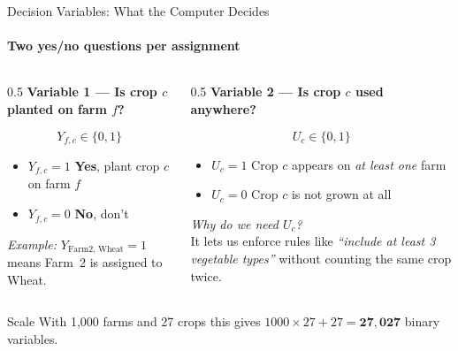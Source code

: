 \begin{frame}{Decision Variables: What the Computer Decides}
    \framesubtitle{Two yes/no questions per assignment}

    \begin{columns}[T]
        \begin{column}{0.5\textwidth}
            \textbf{Variable 1 — Is crop $c$ planted on farm $f$?}
            \vspace{0.2cm}

            \begin{equation*}
                Y_{f,c} \in \{0, 1\}
            \end{equation*}

            \vspace{0.1cm}
            \begin{itemize}\small
                \item $Y_{f,c} = 1$ \quad \textbf{Yes}, plant crop $c$ on farm $f$
                \item $Y_{f,c} = 0$ \quad \textbf{No}, don't
            \end{itemize}

            \vspace{0.5cm}
            \textit{Example:} $Y_{\text{Farm2, Wheat}} = 1$ means
            Farm~2 is assigned to Wheat.
        \end{column}
        \begin{column}{0.5\textwidth}
            \textbf{Variable 2 — Is crop $c$ used anywhere?}
            \vspace{0.2cm}

            \begin{equation*}
                U_{c} \in \{0, 1\}
            \end{equation*}

            \vspace{0.1cm}
            \begin{itemize}\small
                \item $U_c = 1$ \quad Crop $c$ appears on \textit{at least one} farm
                \item $U_c = 0$ \quad Crop $c$ is not grown at all
            \end{itemize}

            \vspace{0.5cm}
            \textit{Why do we need $U_c$?}\\
            It lets us enforce rules like
            \emph{``include at least 3 vegetable types''} without
            counting the same crop twice.
        \end{column}
    \end{columns}

    \vspace{0.4cm}
    \begin{alertblock}{Scale}
        With 1,000 farms and 27 crops this gives
        $1000 \times 27 + 27 = \mathbf{27{,}027}$ binary variables.
    \end{alertblock}
\end{frame}

